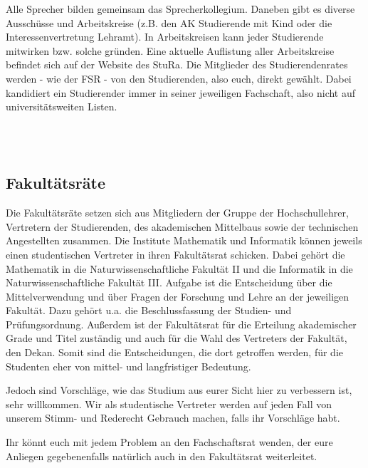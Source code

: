 Alle Sprecher bilden gemeinsam das Sprecherkollegium.
Daneben gibt es diverse Ausschüsse und Arbeitskreise (z.B. den AK Studierende mit Kind oder die Interessenvertretung Lehramt).
In Arbeitskreisen kann jeder Studierende mitwirken bzw. solche gründen.
Eine aktuelle Auflistung aller Arbeitskreise befindet sich auf der Website des StuRa.
Die Mitglieder des Studierendenrates werden - wie der FSR - von den Studierenden, also euch, direkt gewählt.
Dabei kandidiert ein Studierender immer in seiner jeweiligen Fachschaft, also nicht auf universitätsweiten Listen.

\\
\\

\subsection{Fakultätsräte}

Die Fakultätsräte setzen sich aus Mitgliedern der Gruppe der Hochschullehrer, Vertretern der Studierenden, des akademischen Mittelbaus sowie der technischen Angestellten zusammen.
Die Institute Mathematik und Informatik können jeweils einen studentischen Vertreter in ihren Fakultätsrat schicken.
Dabei gehört die Mathematik in die Naturwissenschaftliche Fakultät II und die Informatik in die Naturwissenschaftliche Fakultät III.
Aufgabe ist die Entscheidung über die Mittelverwendung und über Fragen der Forschung und Lehre an der jeweiligen Fakultät.
Dazu gehört u.a. die Beschlussfassung der Studien- und Prüfungsordnung.
Außerdem ist der Fakultätsrat für die Erteilung akademischer Grade und Titel zuständig und auch für die Wahl des Vertreters der Fakultät, den Dekan.
Somit sind die Entscheidungen, die dort getroffen werden, für die Studenten eher von mittel- und langfristiger Bedeutung.

Jedoch sind Vorschläge, wie das Studium aus eurer Sicht hier zu verbessern ist, sehr willkommen.
Wir als studentische Vertreter werden auf jeden Fall von unserem Stimm- und Rederecht Gebrauch machen, falls ihr Vorschläge habt.

Ihr könnt euch mit jedem Problem an den Fachschaftsrat wenden, der eure Anliegen gegebenenfalls natürlich auch in den Fakultätsrat weiterleitet.

\\
\\


